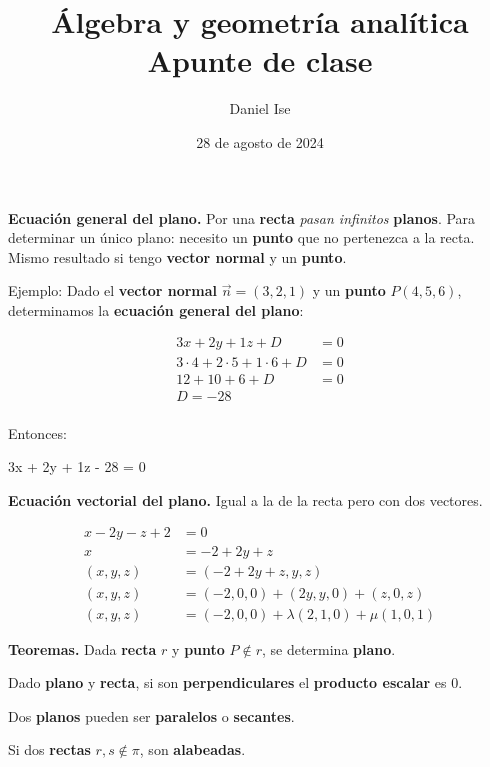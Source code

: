 \documentclass{article}
\title{Álgebra y geometría analítica\\Apunte de clase}
\author{Daniel Ise}
\date{28 de agosto de 2024}
\begin{document}
\maketitle

\textbf{Ecuación general del plano.} Por una \textbf{recta}
\textit{pasan infinitos} \textbf{planos}. Para determinar un único plano:
necesito un \textbf{punto} que no pertenezca a la recta. Mismo resultado si
tengo \textbf{vector normal} y un \textbf{punto}.

Ejemplo: Dado el \textbf{vector normal} \(\vec{n} = (3,2,1)\) y un
\textbf{punto} \(P (4, 5, 6)\), determinamos la
\textbf{ecuación general del plano}:

\begin{align*}
    3x + 2y + 1z + D                      & = 0            \\
    3 \cdot 4 + 2 \cdot 5 + 1 \cdot 6 + D & = 0            \\
    12 + 10 + 6 + D                       & = 0            \\
    \boxed{D                                      = - 28 } \\
\end{align*}

Entonces:

\begin{center}
    3x + 2y + 1z - 28 = 0
\end{center}

\textbf{Ecuación vectorial del plano.} Igual a la de la recta pero con dos
vectores.

\begin{align*}
    x - 2y - z + 2 & = 0           \\
    x              & = -2 + 2y + z \\
    (x, y, z) & = (-2 + 2y + z, y, z)\\
    (x, y, z) & = (-2, 0, 0) + (2y, y, 0) + (z, 0, z)\\
    (x, y, z) & = (-2, 0, 0) + \lambda (2, 1, 0) + \mu (1, 0, 1)
\end{align*}

\textbf{Teoremas.} Dada \textbf{recta} \(r\) y \textbf{punto} \(P \notin r\), se
determina \textbf{plano}.

Dado \textbf{plano} y \textbf{recta}, si son \textbf{perpendiculares} el 
\textbf{producto escalar} es 0.

Dos \textbf{planos} pueden ser \textbf{paralelos} o \textbf{secantes}. 

Si dos \textbf{rectas} \(r, s \notin \pi\), son \textbf{alabeadas}.
\end{document}
